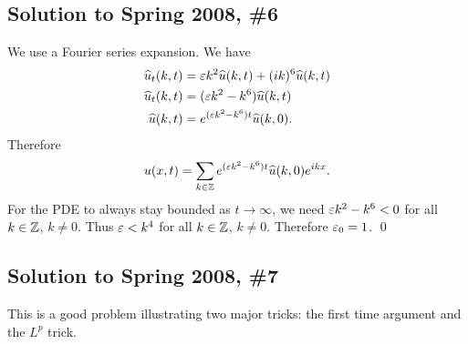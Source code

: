 \subsection*{Solution to Spring 2008, \#6}\label{s086}
We use a Fourier series expansion. We have
\begin{align*}
\widehat{u}_{t}(k, t) &= \varepsilon k^{2}\widehat{u}(k, t) + (ik)^{6}\widehat{u}(k, t)\\
\widehat{u}_{t}(k, t) &= (\varepsilon k^{2} - k^{6})\widehat{u}(k, t)\\
\widehat{u}(k, t) &= e^{(\varepsilon k^{2} - k^{6})t}\widehat{u}(k, 0).
\end{align*}
Therefore
$$u(x, t) = \sum_{k \in \mathbb{Z}}e^{(\varepsilon k^{2} - k^{6})t}\widehat{u}(k, 0)e^{ikx}.$$
For the PDE to always stay bounded as $t \rightarrow \infty$, we need
$\varepsilon k^{2} - k^{6} < 0$ for all $k \in \mathbb{Z}$, $k \neq 0$. Thus
$\varepsilon < k^{4}$ for all $k \in \mathbb{Z}$, $k \neq 0$. Therefore
$\varepsilon_{0} = 1$.
\hfill\qed

\subsection*{Solution to Spring 2008, \#7}\label{s087}
This is a good problem illustrating two major tricks: the first time argument and the $L^{p}$ trick.

